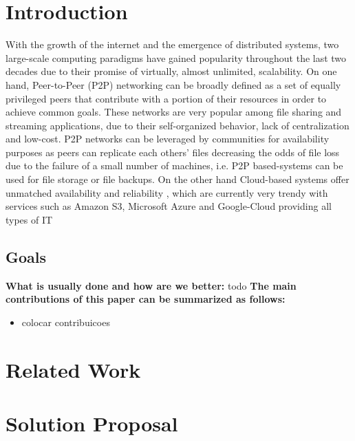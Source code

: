 \documentclass[runningheads]{llncs}
\begin{document}
\section{Introduction}\label{sec:intro}
With the growth of the internet and the emergence of distributed systems, two large-scale computing paradigms have gained popularity throughout the last two decades due to their promise of virtually, almost unlimited, scalability. On one hand,  Peer-to-Peer (P2P) networking can be broadly defined as a set of equally privileged peers that contribute with a portion of their resources in order to achieve common goals. These networks are very popular \cite{ssaroiu:msp2pfss} among file sharing and streaming applications, due to their self-organized behavior, lack of centralization and low-cost. P2P networks can be leveraged by communities for availability purposes as peers can replicate each others' files decreasing the odds of file loss due to the failure of a small number of machines, i.e. P2P based-systems can be used for file storage or file backups. On the other hand Cloud-based systems offer unmatched availability and reliability , which are currently very trendy with services such as Amazon S3, Microsoft Azure and Google-Cloud providing all types of IT
\subsection{Goals}\label{subsec:intro}
\textbf{What is usually done and how are we better:} todo\newline
\textbf{The main contributions of this paper can be summarized as follows:}
\begin{itemize}
	\item colocar contribuicoes
\end{itemize}

\section{Related Work}\label{sec:relatedwork}

\section{Solution Proposal}\label{sec:proposal}
\end{document}
